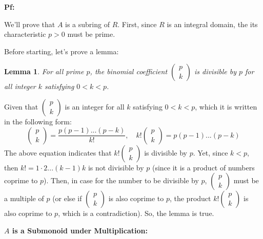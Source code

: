 \documentclass{article}
\newtheorem{lemma}{Lemma}
\begin{document}
\textbf{Pf:}

We'll prove that $A$ is a subring of $R$. First, since $R$ is an integral domain, the its characteristic $p>0$ must be prime.

\hfill

Before starting, let's prove a lemma:
\begin{lemma}
    For all prime $p$, the binomial coefficient $\begin{pmatrix}
        p\\k
    \end{pmatrix}$ is divisible by $p$ for all integer $k$ satisfying $0<k<p$.
\end{lemma}

Given that $\begin{pmatrix}
    p\\k
\end{pmatrix}$ is an integer for all $k$ satisfying $0<k<p$, which it is written in the following form:
$$\begin{pmatrix}
    p\\k
\end{pmatrix}=\frac{p(p-1)...(p-k)}{k!},\quad k!\begin{pmatrix}
    p\\k
\end{pmatrix}=p(p-1)...(p-k)$$
The above equation indicates that $k!\begin{pmatrix}
    p\\k
\end{pmatrix}$ is divisible by $p$. Yet, since $k<p$, then $k!=1\cdot 2...(k-1)k$ is not divisible by $p$ (since it is a product of numbers coprime to $p$).
Then, in case for the number to be divisible by $p$, $\begin{pmatrix}
    p\\k
\end{pmatrix}$ must be a multiple of $p$ (or else if $\begin{pmatrix}
    p\\k
\end{pmatrix}$ is also coprime to $p$, the product $k!\begin{pmatrix}
    p\\k
\end{pmatrix}$ is also coprime to $p$, which is a contradiction). So, the lemma is true.

\hfill

\hfill

\textbf{$A$ is a Submonoid under Multiplication:}
\end{document}
